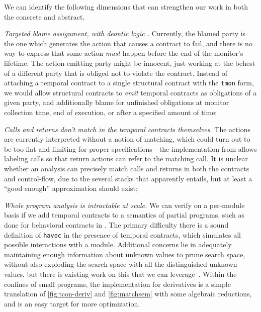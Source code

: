 %
We can identify the following dimensions that can strengthen our work in both the concrete and abstract.

\emph{Targeted blame assignment, with deontic logic \citep{ianjohnson:DBLP:conf/dagstuhl/MeyerWD98}.}
%
Currently, the blamed party is the one which generates the action that causes a contract to fail, and there is no way to express that some action \emph{must} happen before the end of the monitor's lifetime.
%
The action-emitting party might be innocent, just working at the behest of a different party that is obliged not to violate the contract.
%
Instead of attaching a temporal contract to a single structural contract with the {\tt tmon} form, we would allow structural contracts to \emph{emit} temporal contracts as obligations of a given party, and additionally blame for unfinished obligations at monitor collection time, end of execution, or after a specified amount of time;

%
\emph{Calls and returns don't match in the temporal contracts themselves.}
%
The actions are currently interpreted without a notion of matching, which could turn out to be too flat and limiting for proper specifications---the implementation from \dfm{} allows labeling calls so that return actions can refer to the matching call.
%
It is unclear whether an analysis can precisely match calls and returns in both the contracts and control-flow, due to the several stacks that apparently entails, but at least a ``good enough'' approximation should exist;
%

%
\emph{Whole program analysis is intractable at scale.}
%
We can verify on a per-module basis if we add temporal contracts to a semantics of partial programs, such as done for behavioral contracts in \citet{dvanhorn:TobinHochstadt2012Higherorder}.
%
The primary difficulty there is a sound definition of {\tt havoc} in the presence of temporal contracts, which simulates all possible interactions with a module.
%
Additional concerns lie in adequately maintaining enough information about unknown values to prune search space, without also exploding the search space with all the distinguished unknown values, but there is existing work on this that we can leverage~\citep{ianjohnson:DBLP:journals/cacm/DilligDA10}.
%
Within the confines of small programs, the implementation for derivatives is a simple translation of \autoref{fig:tcon-deriv} and \autoref{fig:matchsem} with some algebraic reductions, and is an easy target for more optimization.
%
%
